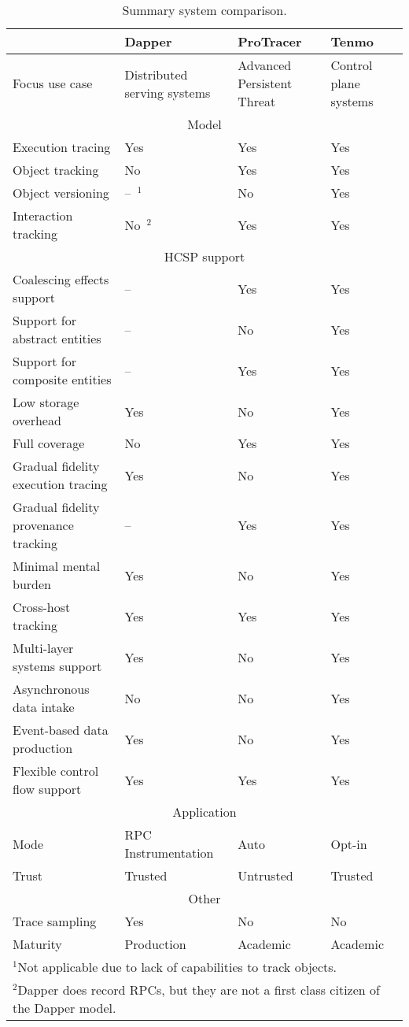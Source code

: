 \begin{table}[pht]
\centering
\begin{tabular}[t]{  p{5cm}  p{3cm}  p{3cm}  p{3cm}  }
\toprule
&Dapper&ProTracer&Tenmo\\
\midrule
Focus use case&Distributed serving systems&Advanced Persistent Threat&Control plane systems\\
\hline
\multicolumn{4}{c}{Model} \\
\hline
Execution tracing&Yes&Yes&Yes\\
Object tracking&No&Yes&Yes\\
Object versioning&--~$^{1}$&No&Yes\\
Interaction tracking&No~$^{2}$&Yes&Yes\\
\hline
\multicolumn{4}{c}{HCSP support} \\
\hline
Coalescing effects support&--&Yes&Yes\\
Support for abstract entities&--&No&Yes\\
Support for composite entities&--&Yes&Yes\\
Low storage overhead&Yes&No&Yes\\
Full coverage&No&Yes&Yes\\
Gradual fidelity execution tracing&Yes&No&Yes\\
Gradual fidelity provenance tracking&--&Yes&Yes\\
Minimal mental burden&Yes&No&Yes\\
Cross-host tracking&Yes&Yes&Yes\\
Multi-layer systems support&Yes&No&Yes\\
Asynchronous data intake&No&No&Yes\\
Event-based data production&Yes&No&Yes\\
Flexible control flow support&Yes&Yes&Yes\\
\hline
\multicolumn{4}{c}{Application} \\
\hline
Mode&RPC Instrumentation&Auto&Opt-in\\
Trust&Trusted&Untrusted&Trusted\\
\hline
\multicolumn{4}{c}{Other} \\
\hline
Trace sampling&Yes&No&No\\
Maturity&Production&Academic&Academic\\
\bottomrule
\hline
\multicolumn{4}{l}{$^{1}$\footnotesize{Not applicable due to lack of capabilities to track objects.}} \\
\multicolumn{4}{l}{$^{2}$\footnotesize{Dapper does record RPCs, but they are not a first class citizen of the Dapper model.}} \\
\end{tabular}
\caption{Summary system comparison.}
\label{tbl:comparison}
\end{table}%

